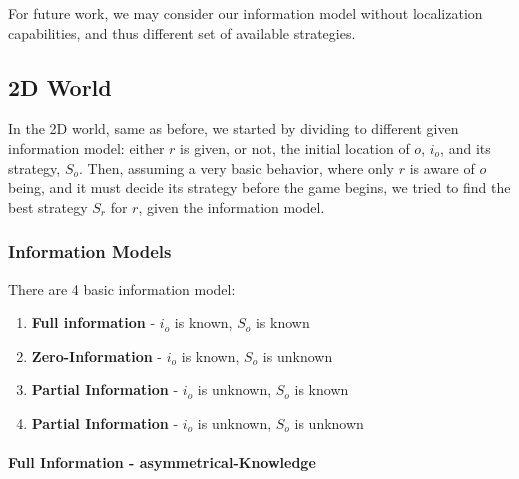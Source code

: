 \documentclass[a4paper,english,10pt]{article}
\newcommand\rob{\ensuremath{r}\xspace}
\newcommand\opp{\ensuremath{o}\xspace}
\begin{document}

For future work, we may consider our information model without localization capabilities, and thus different set of available strategies.

\subsection{2D World}
In the 2D world, same as before, we started by dividing to different given information model: either \rob is given, or not, the initial location of \opp, $i_\opp$, and its strategy, $S_\opp$. Then, assuming a very basic behavior, where only \rob is aware of \opp being, and it must decide its strategy before the game begins, we tried to find the best strategy $S_\rob$ for \rob, given the information model.

\subsubsection{Information Models}
There are 4 basic information model: 
\begin{enumerate}
\item \textbf{Full information} - $i_\opp$ is known, $S_\opp$ is known
\item \textbf{Zero-Information} - $i_\opp$ is known, $S_\opp$ is unknown
\item \textbf{Partial Information} -  $i_\opp$ is unknown, $S_\opp$ is known
\item \textbf{Partial Information} - $i_\opp$ is unknown, $S_\opp$ is unknown
\end{enumerate}

\paragraph{Full Information - asymmetrical-Knowledge}
\end{document}
